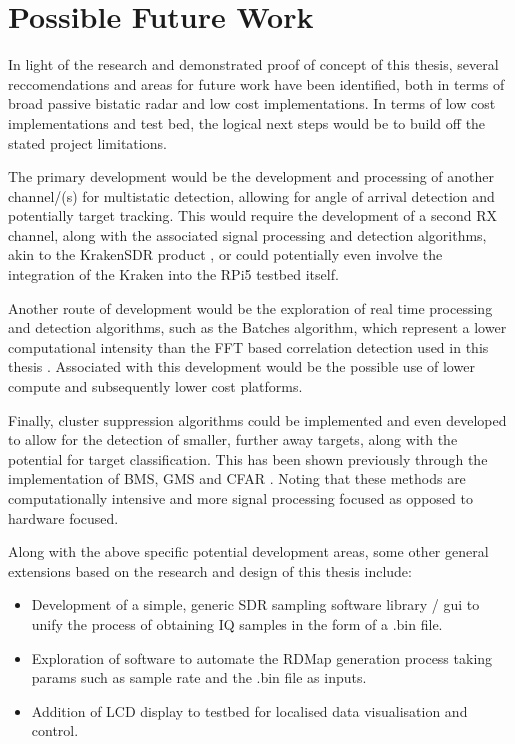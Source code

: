 \section{Possible Future Work \label{sec:future_work}}
In light of the research and demonstrated proof of concept of this thesis, several reccomendations and areas for future work have been identified, both in terms of broad passive bistatic radar and low cost implementations. In terms of low cost implementations and test bed, the logical next steps would be to build off the stated project limitations.
\par
The primary development would be the development and processing of another channel/(s) for multistatic detection, allowing for angle of arrival detection and potentially target tracking. This would require the development of a second RX channel, along with the associated signal processing and detection algorithms, akin to the KrakenSDR product \cite{KrakenSDR}, or could potentially even involve the integration of the Kraken into the RPi5 testbed itself.
\par
Another route of development would be the exploration of real time processing and detection algorithms, such as the Batches algorithm, which represent a lower computational intensity than the FFT based correlation detection used in this thesis \cite{IOTpassiveRadar}. Associated with this development would be the possible use of lower compute and subsequently lower cost platforms. 
\par
Finally, cluster suppression algorithms could be implemented and even developed to allow for the detection of smaller, further away targets, along with the potential for target classification. This has been shown previously through the implementation of BMS, GMS and CFAR \cite{ZhangClutter}. Noting that these methods are computationally intensive and more signal processing focused as opposed to hardware focused.
\par 
Along with the above specific potential development areas, some other general extensions based on the research and design of this thesis include:
\begin{itemize}
    \item Development of a simple, generic SDR sampling software library / gui to unify the process of obtaining IQ samples in the form of a .bin file.
    \item Exploration of software to automate the RDMap generation process taking params such as sample rate and the .bin file as inputs.
    \item Addition of LCD display to testbed for localised data visualisation and control.
\end{itemize}